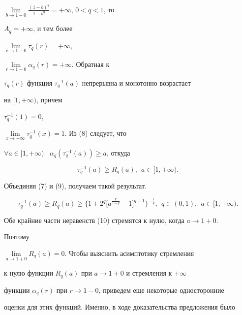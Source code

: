 $\lim\limits_{b\to 1-0}\frac{(1-b)^q}{1-b^q}=+\infty$, $0<q<1$, то


$A_q=+\infty$, и тем более


$\lim\limits_{r\to1-0}\tau_q(r)=+\infty$,


$\lim\limits_{r\to1-0}\alpha_q(r)=+\infty$. Обратная к


$\tau_q(r)$ функция $\tau^{-1}_{q}(a)$ непрерывна и монотонно возрастает


на $[1,+\infty)$, причем


$\tau^{-1}_{q}(1)=0$,


$\lim\limits_{x\to +\infty}\tau^{-1}_{q}(x)=1$. Из (8) следует, что


$\forall a\in[1,+\infty)$ \ $\alpha_q(\tau^{-1}_{q}(a))\geq a$, откуда


\begin{equation}


\tau^{-1}_{q}(a)\geq R_q(a),\ \ a\in [1,+\infty).


\end{equation}


Объединяя (7) и (9), получаем такой результат.





\begin{thm} \phantom{m}


\begin{equation}


\tau^{-1}_{q}(a)\geq R_q(a)\geq


\big\{1+2^q\big[a^{\frac{q}{1-q}}-1\big]^{q-1}\big\}^


{-\frac{1}{q}}, \ \ q\in(0,1), \ \ a\in[1,+\infty).


\end{equation}


\end{thm}





Обе крайние части неравенств (10) стремятся к нулю, когда $a\to 1+0$.


Поэтому


$\lim\limits_{a\to 1+0} R_q(a){=}0$. Чтобы выяснить асимптотику стремления


к нулю функции $R_q(a)$ при $a\to 1+0$ и стремления к $+\infty$


функции $\alpha_q(r)$ при $r\to 1-0$, приведем еще некоторые односторонние


оценки для этих функций. Именно, в ходе доказательства предложения было


